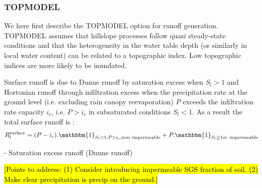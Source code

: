 \documentclass[twoside,10pt]{report}
\begin{document}
\subsubsection{TOPMODEL}
We here first describe the TOPMODEL option for runoff generation. TOPMODEL assumes that hillslope processes follow quasi steady-state conditions and that the heterogeneity in the water table depth (or similarly in local water content) can be related to a topographic index. Low topographic indices are more likely to be inundated.

Surface runoff is due to Dunne runoff by saturation excess when $S_l > 1$ and Hortonian runoff through infiltration excess when the precipitation rate at the ground level (i.e. excluding rain canopy reevaporation) $P$ exceeds the infiltration rate capacity $i_c$, i.e. $P>i_c$ in subsaturated conditions $S_l < 1$. As a result the total surface runoff is \citep{Entekhabi89}:
 \begin{equation}
    R_l^{\rm surface} = (P-i_c).\mathbbm{1}_{S_l < 1, P>i_c, {\rm non \ impermeable}} + P.\mathbbm{1}_{ S_l \ge 1 {\rm or \ impermeable}}
\end{equation}

- Saturation excess runoff (Dunne runoff)

\hl{[Points to address: (1) Consider introducing impermeable SGS fraction of soil. (2) Make clear precipitation is precip on the ground.]}
\end{document}

